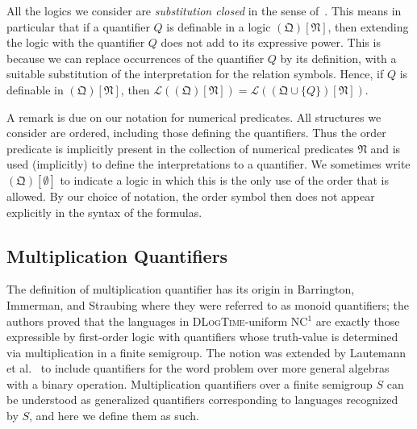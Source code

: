 \documentclass[a4paper,UKenglish,cleveref, autoref, thm-restate, anonymous]{lipics-v2021}
\begin{document}
All the logics we consider are \emph{substitution closed} in the sense of~\cite{Ebb85}.  This means in particular that if a quantifier $Q$ is definable in a logic $(\mathfrak{Q})[\mathfrak{N}]$, then extending the logic with the quantifier $Q$ does not add to its expressive power.  This is because we can replace occurrences of the quantifier $Q$ by its definition, with a suitable substitution of the interpretation for the relation symbols.  Hence, if $Q$ is definable in $(\mathfrak{Q})[\mathfrak{N}]$, then $\mathcal{L}((\mathfrak{Q})[\mathfrak{N}]) = \mathcal{L}((\mathfrak{Q} \cup \{Q\})[\mathfrak{N}])$.

A remark is due on our notation for numerical predicates.  All structures we consider are ordered, including those defining the quantifiers.  Thus the order predicate is implicitly present in the collection of numerical predicates $\mathfrak{N}$ and is used (implicitly) to define the interpretations to a quantifier.  We sometimes write $(\mathfrak{Q})[\emptyset]$ to indicate a logic in which this is the only use of the order that is allowed.  By our choice of notation, the order symbol then does not appear explicitly in the syntax of the formulas.

\subsection{Multiplication Quantifiers}

The definition of multiplication quantifier has its origin in Barrington, Immerman, and Straubing \cite[Section 5]{barrington1990uniformity} where they were referred to as monoid quantifiers; the authors proved that the languages in \textsc{DLogTime}-uniform NC${}^1$ are exactly those expressible by first-order logic with quantifiers whose truth-value is determined via multiplication in a finite semigroup.  The notion was extended by Lautemann et al.~\cite{lautemann2001descriptive} to include quantifiers for the word problem over more general algebras with a binary operation.  Multiplication quantifiers over a finite semigroup $S$ can be understood as generalized quantifiers corresponding to languages recognized by $S$, and here we define them as such.
\end{document}
